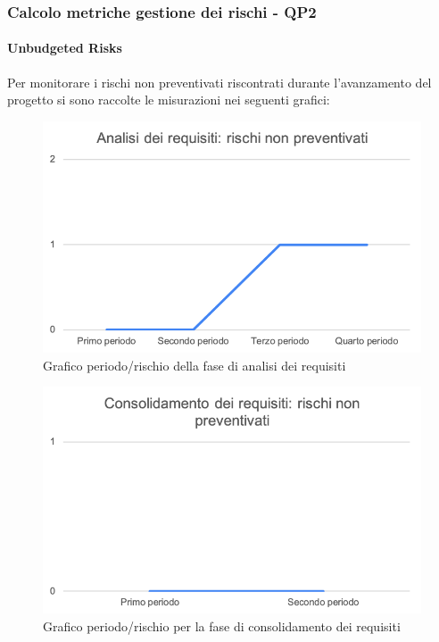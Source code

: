 \subsubsection{Calcolo metriche gestione dei rischi - QP2}

\paragraph{Unbudgeted Risks}
Per monitorare i rischi non preventivati riscontrati durante l'avanzamento del progetto si sono raccolte le misurazioni nei seguenti grafici:

	\begin{figure}[H]
		\centering
		\includegraphics[width=0.8\linewidth]{./res/images/RischiNonPrevent_1.png}
		\caption{Grafico periodo/rischio della fase di analisi dei requisiti}
		\label{fig:Grafico periodo/rischio nel periodo di analisi dei requisiti}
	\end{figure}

	\begin{figure}[H]
			\centering
			\includegraphics[width=0.8\linewidth]{./res/images/RischiNonPrevent_2.png}
			\caption{Grafico periodo/rischio per la fase di consolidamento dei requisiti}
			\label{fig:Grafico periodo/rischio per la fase di consolidamento dei requisiti}
	\end{figure}


